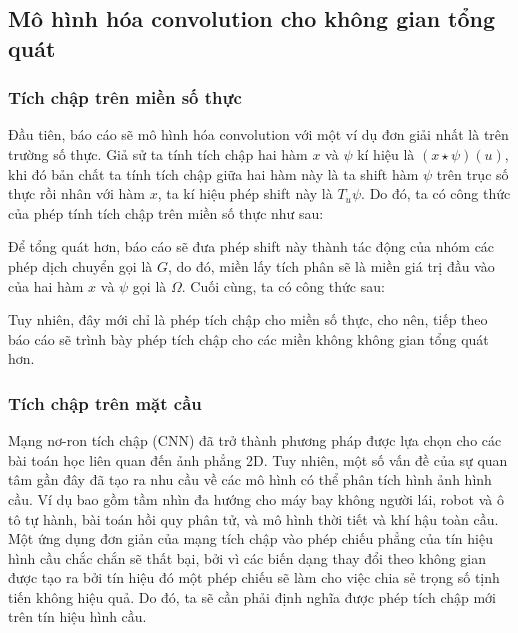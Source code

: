 \subsection{Mô hình hóa convolution cho không gian tổng quát}
\subsubsection{Tích chập trên miền số thực}

Đầu tiên, báo cáo sẽ mô hình hóa convolution với một ví dụ đơn giải nhất là trên trường số thực. Giả sử ta tính tích chập hai hàm $x$ và $\psi$ kí hiệu là $(x \star \psi)(u)$, khi đó bản chất ta tính tích chập giữa hai hàm này là ta shift hàm $\psi$ trên trục số thực rồi nhân với hàm $x$\cite{geometricdeep2022}, ta kí hiệu phép shift này là $T_u\psi$. Do đó, ta có công thức của phép tính tích chập trên miền số thực như sau:

\begin{center}
\end{center}

Để tổng quát hơn, báo cáo sẽ đưa phép shift này thành tác động của nhóm các phép dịch chuyển gọi là $G$, do đó, miền lấy tích phân sẽ là miền giá trị đầu vào của hai hàm $x$ và $\psi$ gọi là $\Omega$. Cuối cùng, ta có công thức sau:

\begin{center}
\end{center}

Tuy nhiên, đây mới chỉ là phép tích chập cho miền số thực, cho nên, tiếp theo báo cáo sẽ trình bày phép tích chập cho các miền không không gian tổng quát hơn.

\subsubsection{Tích chập trên mặt cầu}
Mạng nơ-ron tích chập (CNN) đã trở thành phương pháp được lựa chọn cho các bài toán học liên quan đến ảnh phẳng 2D. Tuy nhiên, một số vấn đề của sự quan tâm gần đây đã tạo ra nhu cầu về các mô hình có thể phân tích hình ảnh hình cầu\cite{cohen2018sphericalcnns}. Ví dụ bao gồm tầm nhìn đa hướng cho máy bay không người lái, robot và ô tô tự hành, bài toán hồi quy phân tử, và mô hình thời tiết và khí hậu toàn cầu. Một ứng dụng đơn giản của mạng tích chập vào phép chiếu phẳng của tín hiệu hình cầu chắc chắn sẽ thất bại, bởi vì các biến dạng thay đổi theo không gian được tạo ra bởi tín hiệu đó một phép chiếu sẽ làm cho việc chia sẻ trọng số tịnh tiến không hiệu quả\cite{cohen2018sphericalcnns}. Do đó, ta sẽ cần phải định nghĩa được phép tích chập mới trên tín hiệu hình cầu.

